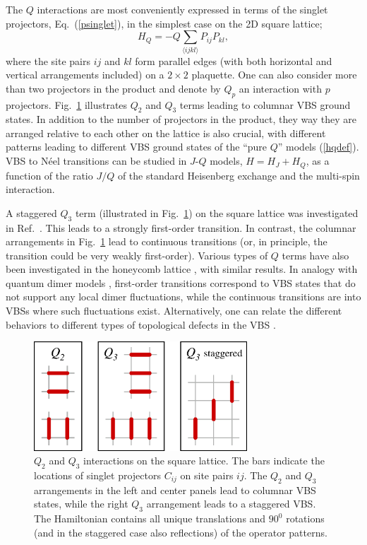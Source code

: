 \documentclass[10pt,pre,aps,twocolumn,showpacs,subscriptaddresses,floatfix]{revtex4}
\begin{document}
The $Q$ interactions are most conveniently expressed in terms of the singlet projectors, Eq.~(\ref{psinglet}), in the simplest case on the 2D square lattice;
\begin{equation}
H_Q = - Q\sum_{\langle ijkl\rangle } P_{ij}P_{kl},
\label{hqdef}
\end{equation}
where the site pairs $ij$ and $kl$ form parallel edges (with both horizontal and vertical arrangements included) on a $2\times 2$ plaquette. 
One can also consider more than two projectors in the product and denote by $Q_p$ an interaction with $p$ projectors. Fig.~\ref{qterms} illustrates $Q_2$ 
and $Q_3$ terms leading to columnar VBS ground states. In addition to the number of projectors in the product, they way they are arranged relative to each 
other on the lattice is also crucial, with different patterns leading to different VBS ground states of the ``pure $Q$'' models (\ref{hqdef}). VBS to N\'eel 
transitions can be studied in $J$-$Q$ models, $H=H_J+H_Q$, as a function of the ratio $J/Q$ of the standard Heisenberg exchange and the multi-spin 
interaction.

A staggered $Q_3$ term (illustrated in Fig.~\ref{qterms})
on the square lattice was investigated in Ref.~\cite{Sen10}. This leads to a strongly first-order transition. In contrast, 
the columnar arrangements in Fig.~\ref{qterms} lead to continuous transitions (or, in principle, the transition could be very weakly first-order). 
Various types of $Q$ terms have also been investigated in the honeycomb lattice \cite{Banerjee11}, with similar results. In analogy with quantum 
dimer models \cite{Rokhsar88,Moessner01}, first-order transitions correspond to VBS states that do not support any local dimer fluctuations, while 
the continuous transitions are into VBSs where such fluctuations exist. Alternatively, one can relate the different behaviors to different types of 
topological defects in the VBS \cite{levin2004:vbs,Banerjee11}.

\begin{figure}
\includegraphics[width=8cm, clip]{fig03.eps}
\caption{$Q_2$ and $Q_3$ interactions on the square lattice. The bars indicate the locations of singlet projectors 
$C_{ij}$ on site pairs $ij$. The $Q_2$ and $Q_3$ arrangements in the left and center panels lead to columnar VBS states,
while the right $Q_3$ arrangement leads to a staggered VBS. The Hamiltonian contains all unique translations and
$90^0$ rotations (and in the staggered case also reflections) of the operator patterns.}
\label{qterms}
\end{figure}
\end{document}
